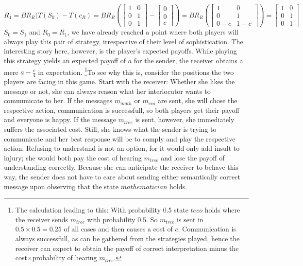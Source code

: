 \documentclass{article}
\begin{document}
\begin{equation*}
R_1=BR_R(T(S_0)-T(c_R)=
BR_R(
\begin{bmatrix}
1 & 0\\
0 & 1\\
0 & 1
\end{bmatrix}
-
\begin{bmatrix}
0\\
0\\
c
\end{bmatrix}
)
=
BR_R(
\begin{bmatrix}
1 & 0\\
0 & 1\\
0-c & 1-c
\end{bmatrix}
)
=
\begin{bmatrix}
1 & 0\\
0 & 1\\
0 & 1
\end{bmatrix}
\end{equation*}
$S_0=S_1$ and $R_0=R_1$, we have already reached a point where both players will always play this pair of strategy, irrespective of their level of sophistication. The interesting story here, however, is the player's expected payoffs. While playing this strategy yields an expected payoff of $a$ for the sender, the receiver obtains a mere $a-\tfrac{c}{4}$ in expectation.
\footnote{The calculation leading to this: With probability 0.5 state $t{eco}$ holds where the receiver sends $m_{tree}$ with probability 0.5. So $m_{tree}$ is sent in $0.5\times 0.5 =0.25$ of all cases and then causes a cost of $c$. Communication is always successfull, as can be gathered from the strategies played, hence the receiver can expect to obtain the payoff of correct interpretation minus the cost$\times$probability of hearing $m_{tree}$.}To see why this is, consider the positions the two players are facing in this game. Start with the receiver: Whether she likes the message or not, she can always reason what her interlocutor wants to communicate to her. If the messages $m_{math}$ or $m_{eco}$ are sent, she will chose the respective action, communication is successfull, so both players get their payoff and everyone is happy. If the message $m_{tree}$ is sent, however, she immediately suffers the associated cost. Still, she knows what the sender is trying to communicate and her best response will be to comply and play the respective action. Refusing to understand is not an option, for it would only add insult to injury; she would both pay the cost of hearing $m_{tree}$ and lose the payoff of understanding correctly. Because she can anticipate the receiver to behave this way, the sender does not have to care about sending either semantically correct message upon observing that the state $mathematician$ holds.
\end{document}
